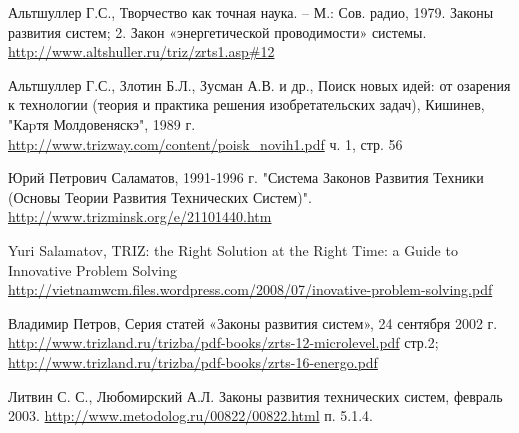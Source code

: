 \documentclass[a4paper,11pt]{article}
\begin{document}
\begin{thebibliography}{xxx}
 Альтшуллер Г.С., Творчество как точная наука. -- М.: Сов. радио,
  1979.  Законы развития систем; 2.  Закон «энергетической проводимости»
  системы. \url{http://www.altshuller.ru/triz/zrts1.asp#12}

 Альтшуллер Г.С., Злотин Б.Л., Зусман А.В. и др., Поиск новых идей:
  от озарения к технологии (теория и практика решения изобретательских задач),
  Кишинев, "Каpтя Молдовеняскэ", 1989 г.
  \url{http://www.trizway.com/content/poisk_novih1.pdf} ч. 1, стр. 56

 Юрий Петрович Саламатов, 1991-1996 г. "Система Законов Развития
  Техники (Основы Теории Развития Технических Систем)".
  \url{http://www.trizminsk.org/e/21101440.htm}

  Yuri Salamatov, TRIZ: the Right Solution at the Right Time: a Guide to
  Innovative Problem Solving
  \url{http://vietnamwcm.files.wordpress.com/2008/07/inovative-problem-solving.pdf}

 Владимир Петров, Серия статей «Законы развития систем», 24
  сентября 2002 г.
  \url{http://www.trizland.ru/trizba/pdf-books/zrts-12-microlevel.pdf} стр.2;
  \url{http://www.trizland.ru/trizba/pdf-books/zrts-16-energo.pdf}

 Литвин С. С., Любомирский А.Л. Законы развития технических систем,
  февраль 2003.  \url{http://www.metodolog.ru/00822/00822.html} п. 5.1.4.
\end{thebibliography}
\end{document}
